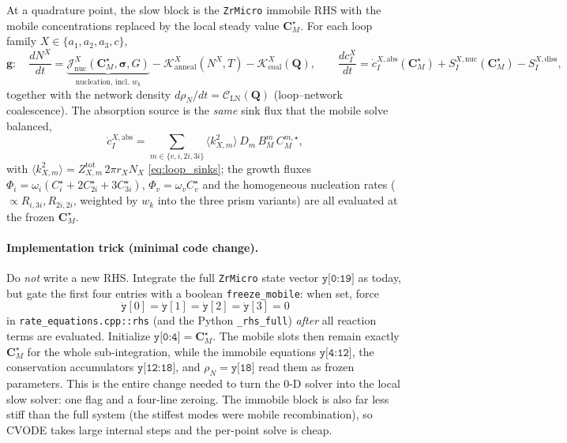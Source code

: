 \documentclass[11pt]{article}
\newcommand{\CM}{\mathbf{C}_{M}}
\newcommand{\sig}{\bm{\sigma}}
\newcommand{\ZrMicro}{\texttt{ZrMicro}}
\newcommand{\code}[1]{\texttt{#1}}
\begin{document}
At a quadrature point, the slow block is the \ZrMicro{} immobile RHS with the
mobile concentrations replaced by the local steady value $\CM^\star$. For each
loop family $X\in\{a_1,a_2,a_3,c\}$,
\begin{equation}
\label{eq:reduced_rhs}
    \mathbf g:\quad
    \frac{dN^{X}}{dt}
    = \underbrace{\mathcal J^{X}_{\mathrm{nuc}}(\CM^\star,\sig,G)}_{\text{nucleation, incl.\ }w_k}
      - \mathcal K^{X}_{\mathrm{anneal}}(N^{X},T)
      - \mathcal K^{X}_{\mathrm{coal}}(\mathbf Q),
    \qquad
    \frac{dc_{I}^{X}}{dt}
    = \dot c^{X,\mathrm{abs}}_I(\CM^\star) + S^{X,\mathrm{nuc}}_I(\CM^\star) - S^{X,\mathrm{diss}}_I,
\end{equation}
together with the network density $d\rho_N/dt=\mathcal C_{\mathrm{LN}}(\mathbf Q)$
(loop--network coalescence). The absorption source is the \emph{same} sink flux
that the mobile solve balanced,
\begin{equation}
\label{eq:abs_consistent}
    \dot c^{X,\mathrm{abs}}_I
    = \sum_{m\in\{v,i,2i,3i\}}\langle k^2_{X,m}\rangle\,D_m\,B_M^{m}\,C_M^{m,\star},
\end{equation}
with $\langle k^2_{X,m}\rangle=Z^{\mathrm{tot}}_{X,m}\,2\pi r_X N_X$
\eqref{eq:loop_sinks}; the growth fluxes $\Phi_i=\omega_i(C_i^\star+2C_{2i}^\star+3C_{3i}^\star)$,
$\Phi_v=\omega_v C_v^\star$ and the homogeneous nucleation rates
($\propto R_{i,3i},R_{2i,2i}$, weighted by $w_k$ into the three prism variants)
are all evaluated at the frozen $\CM^\star$.

\paragraph{Implementation trick (minimal code change).}
Do \emph{not} write a new RHS. Integrate the full \ZrMicro{} state vector
$\texttt{y[0:19]}$ as today, but gate the first four entries with a boolean
\code{freeze\_mobile}: when set, force
\[
    \dot{\texttt{y}}[0]=\dot{\texttt{y}}[1]=\dot{\texttt{y}}[2]=\dot{\texttt{y}}[3]=0
\]
in \code{rate\_equations.cpp::rhs} (and the Python \code{\_rhs\_full}) \emph{after}
all reaction terms are evaluated. Initialize $\texttt{y[0:4]}=\CM^\star$. The
mobile slots then remain exactly $\CM^\star$ for the whole sub-integration, while
the immobile equations $\texttt{y[4:12]}$, the conservation accumulators
$\texttt{y[12:18]}$, and $\rho_N=\texttt{y[18]}$ read them as frozen parameters.
This is the entire change needed to turn the 0-D solver into the local slow
solver: one flag and a four-line zeroing. The immobile block is also far less
stiff than the full system (the stiffest modes were mobile recombination), so
CVODE takes large internal steps and the per-point solve is cheap.
\end{document}
